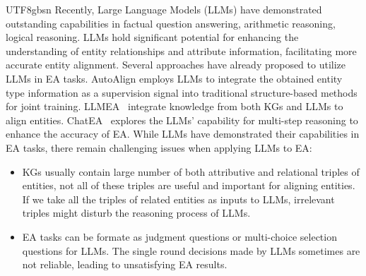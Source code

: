 \documentclass[preprint,12pt]{elsarticle}
\begin{document}
\begin{CJK}{UTF8}{gbsn}
Recently, Large Language Models (LLMs) have demonstrated outstanding capabilities in factual question answering\cite{yu2022generate}, arithmetic reasoning\cite{chen2022program}, logical reasoning\cite{pan2023logic}. LLMs hold significant potential for enhancing the understanding of entity relationships and attribute information, facilitating more accurate entity alignment. Several approaches have already proposed to utilize LLMs in EA tasks. AutoAlign\cite{autoalign} employs LLMs to integrate the obtained entity type information as a supervision signal into traditional structure-based methods for joint training. LLMEA~\cite{LLMEA} integrate knowledge from both KGs and LLMs to align entities. ChatEA~\cite{ChatEA} explores the LLMs’ capability for multi-step reasoning to enhance the accuracy of EA. While LLMs have demonstrated their capabilities in EA tasks, there remain challenging issues when applying LLMs to EA:
\begin{itemize}
    \item KGs usually contain large number of both attributive and relational triples of entities, not all of these triples are useful and important for aligning entities. If we take all the triples of related entities as inputs to LLMs, irrelevant triples might disturb the reasoning process of LLMs. 
    \item EA tasks can be formate as judgment questions or multi-choice selection questions for LLMs. The single round decisions made by LLMs sometimes are not reliable, leading to unsatisfying EA results. 
\end{itemize}


\end{CJK}
\end{document}
